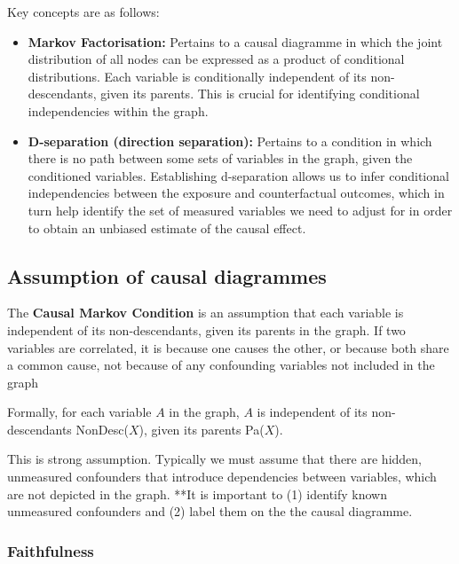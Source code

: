 \documentclass[
  singlecolumn]{report}
\begin{document}
Key concepts are as follows:

\begin{itemize}
\item
  \textbf{Markov Factorisation:} Pertains to a causal diagramme in which
  the joint distribution of all nodes can be expressed as a product of
  conditional distributions. Each variable is conditionally independent
  of its non-descendants, given its parents. This is crucial for
  identifying conditional independencies within the graph.
\item
  \textbf{D-separation (direction separation):} Pertains to a condition
  in which there is no path between some sets of variables in the graph,
  given the conditioned variables. Establishing d-separation allows us
  to infer conditional independencies between the exposure and
  counterfactual outcomes, which in turn help identify the set of
  measured variables we need to adjust for in order to obtain an
  unbiased estimate of the causal effect.
\end{itemize}

\hypertarget{assumption-of-causal-diagrammes}{%
\subsection{Assumption of causal
diagrammes}\label{assumption-of-causal-diagrammes}}

The \textbf{Causal Markov Condition} is an assumption that each variable
is independent of its non-descendants, given its parents in the graph.
If two variables are correlated, it is because one causes the other, or
because both share a common cause, not because of any confounding
variables not included in the graph

Formally, for each variable \(A\) in the graph, \(A\) is independent of
its non-descendants NonDesc(\(X\)), given its parents Pa(\(X\)).

This is strong assumption. Typically we must assume that there are
hidden, unmeasured confounders that introduce dependencies between
variables, which are not depicted in the graph. **It is important to (1)
identify known unmeasured confounders and (2) label them on the the
causal diagramme.

\hypertarget{faithfulness}{%
\subsubsection{\texorpdfstring{\textbf{Faithfulness}}{Faithfulness}}\label{faithfulness}}
\end{document}
